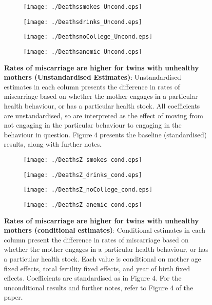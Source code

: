 \documentclass[12pt]{article}
\begin{document}
\begin{spacing}{1}
\begin{figure}[htpb!]
\begin{subfigure}{.5\textwidth}
  \texttt{[image: ./Deathssmokes\_Uncond.eps]}
\end{subfigure}%
\begin{subfigure}{.5\textwidth}
  \texttt{[image: ./Deathsdrinks\_Uncond.eps]}
\end{subfigure}
\begin{subfigure}{.5\textwidth}
  \texttt{[image: ./DeathsnoCollege\_Uncond.eps]}
\end{subfigure}%
\begin{subfigure}{.5\textwidth}
  \texttt{[image: ./Deathsanemic\_Uncond.eps]}
\end{subfigure}
\vspace{5mm}
\caption{\textbf{Rates of miscarriage are higher for twins with unhealthy mothers (Unstandardised Estimates)}: {\footnotesize Unstandardised estimates in each column presents the difference in rates of miscarriage based on whether the mother engages in a particular health behaviour, or has a particular health stock.  All coefficients are unstandardised, so are interpreted as the effect of moving from not engaging in the particular behaviour to engaging in the behaviour in question. Figure 4 presents the baseline (standardised) results, along with further notes.}}
\label{fig:miscarriageUnstand}
\end{figure}

\begin{figure}[htpb!]
\begin{subfigure}{.5\textwidth}
  \texttt{[image: ./DeathsZ\_smokes\_cond.eps]}
\end{subfigure}%
\begin{subfigure}{.5\textwidth}
  \texttt{[image: ./DeathsZ\_drinks\_cond.eps]}
\end{subfigure}
\begin{subfigure}{.5\textwidth}
  \texttt{[image: ./DeathsZ\_noCollege\_cond.eps]}
\end{subfigure}%
\begin{subfigure}{.5\textwidth}
  \texttt{[image: ./DeathsZ\_anemic\_cond.eps]}
\end{subfigure}
\vspace{5mm}
\caption{\textbf{Rates of miscarriage are higher for twins with unhealthy mothers (conditional estimates)}: {\footnotesize Conditional estimates in each column present the difference in rates of miscarriage based on whether the mother engages in a particular health behaviour, or has a particular health stock.  Each value is conditional on mother age fixed effects, total fertility fixed effects, and year of birth fixed effects. Coefficients are standardised as in Figure 4. For the unconditional results and further notes, refer to Figure 4 of the paper.}}
\label{fig:miscarriageCond}
\end{figure}


\end{spacing}
\end{document}
